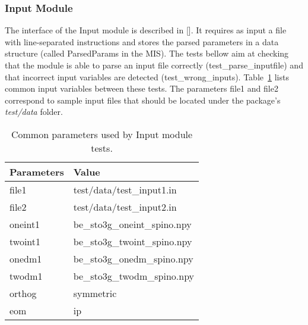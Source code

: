 \documentclass[12pt, titlepage]{article}
\begin{document}
\subsubsection{Input Module}
\label{sec:M3}

The interface of the Input  module is described in [\cite{MIS2020}]. It 
requires as input a file with line-separated instructions and stores the parsed 
parameters in a data structure (called ParsedParams in the MIS). The tests 
bellow aim at checking that the module is able to parse an input file correctly 
(test\_parse\_inputfile) and that incorrect input variables are detected 
(test\_wrong\_inputs). Table~\ref{table:loaddata} lists common input variables 
between these tests. The parameters file1 and file2 correspond to sample input 
files that should be located under the package's \textit{test/data} folder.
\begin{table}[h!]
	\centering
	\begin{tabular}{ll}
		Parameters& Value\\
		\midrule
		file1& test/data/test\_input1.in\\
		file2 & test/data/test\_input2.in\\ 
		oneint1 & be\_sto3g\_oneint\_spino.npy\\
		twoint1 & be\_sto3g\_twoint\_spino.npy\\
		onedm1 & be\_sto3g\_onedm\_spino.npy\\
		twodm1 & be\_sto3g\_twodm\_spino.npy\\
		orthog& symmetric\\
		eom& ip\\
		\bottomrule
	\end{tabular}
	\caption{Common parameters used by Input module tests.}
	\label{table:loaddata}
\end{table}
\end{document}
